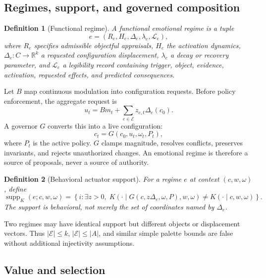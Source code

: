 \documentclass[11pt]{article}
\newtheorem{definition}{Definition}
\newcommand{\R}{\mathbb{R}}
\newcommand{\supp}{\operatorname{supp}}
\begin{document}
\subsection{Regimes, support, and governed composition}

\begin{definition}[Functional regime]
A functional emotional regime is a tuple
\begin{equation}
e=(R_e,H_e,\Delta_e,\lambda_e,\mathcal{L}_e),
\end{equation}
where $R_e$ specifies admissible objectful appraisals, $H_e$ the activation
dynamics, $\Delta_e:C\to\R^k$ a requested configuration displacement,
$\lambda_e$ a decay or recovery parameter, and $\mathcal{L}_e$ a legibility
record containing trigger, object, evidence, activation, requested effects, and
predicted consequences.
\end{definition}

Let $B$ map continuous modulation into configuration requests.  Before policy
enforcement, the aggregate request is
\begin{equation}
u_t=B m_t+\sum_{e\in\mathcal{E}}z_{e,t}\Delta_e(c_0).
\end{equation}
A governor $G$ converts this into a live configuration:
\begin{equation}
c_t=G(c_0,u_t,\omega_t,P_t),
\label{eq:governor}
\end{equation}
where $P_t$ is the active policy.  $G$ clamps magnitude, resolves conflicts,
preserves invariants, and rejects unauthorized changes.  An emotional regime is
therefore a source of proposals, never a source of authority.

\begin{definition}[Behavioral actuator support]
For a regime $e$ at context $(c,w,\omega)$, define
\begin{equation}
\supp_K(e;c,w,\omega)=\left\{i:\exists z>0,\;
K(\cdot\mid G(c,z\Delta_e,\omega,P),w,\omega)
\ne K(\cdot\mid c,w,\omega)\right\}.
\end{equation}
The support is behavioral, not merely the set of coordinates named by
$\Delta_e$.
\end{definition}

Two regimes may have identical support but different objects or displacement
vectors.  Thus $|\mathcal{E}|\leq k$, $|\mathcal{E}|\leq|A|$, and similar simple
palette bounds are false without additional injectivity assumptions.

\subsection{Value and selection}
\end{document}
